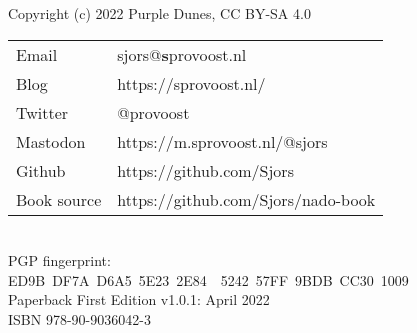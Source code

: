 \newpage
{\setlength{\parindent}{0cm}
\begin{vplace}
Copyright (c) 2022 Purple Dunes, CC BY-SA 4.0\\

\begin{tabular}{@{} l l }
Email & sjors@\textbf{s}provoost.nl \\
Blog & https://sprovoost.nl/ \\
Twitter & @provoost \\
Mastodon & https://m.sprovoost.nl/@sjors \\
Github & https://github.com/Sjors \\
Book source & https://github.com/Sjors/nado-book \\
\end{tabular}
\\

PGP fingerprint:\\
ED9B DF7A D6A5 5E23 2E84  5242 57FF 9BDB CC30 1009\\

Paperback First Edition v1.0.1: April 2022\\

ISBN 978-90-9036042-3\\
\end{vplace}
}
